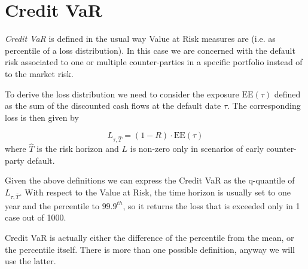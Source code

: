 \section{Credit VaR}\label{credit-var-cr-var}


\emph{Credit VaR} is defined in the usual way Value at Risk measures are (i.e. as percentile of a loss distribution).
In this case we are concerned with the default risk associated to one or
multiple counter-parties in a specific portfolio instead of to the market risk.

To derive the loss distribution we need to consider the exposure $\textrm{EE}(\tau)$ defined as the sum of the discounted cash flows at the default date $\tau$.
The corresponding loss is then given by

\begin{equation}
L_{\tau, \hat{T}} = (1 - R) \cdot \textrm{EE}(\tau)
\end{equation}
where \(\hat{T}\) is the risk horizon and $L$ is non-zero only in
scenarios of early counter-party default. 

Given the above definitions we can express the Credit VaR as the 
q-quantile of $L_{\tau, \hat{T}}$.
With respect to the Value at Risk, the time horizon is usually set to one year and the percentile to $99.9^{th}$, so it returns the loss that is 
exceeded only in 1 case out of 1000. 

Credit VaR is actually either the difference of the percentile from the mean, or the percentile itself. There is more than one possible definition, anyway we  will use the latter.

%

